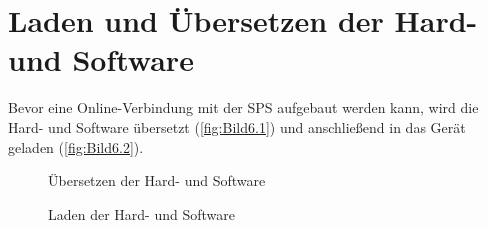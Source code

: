 \section{Laden und Übersetzen der Hard- und Software} \label{sec: laden_und_uebersetzen}

Bevor eine Online-Verbindung mit der SPS aufgebaut werden kann, wird die Hard- und Software übersetzt (\autoref{fig:Bild6.1}) und anschließend in das Gerät geladen (\autoref{fig:Bild6.2}).

\begin{figure}[H]
   \centering
   \caption[Übersetzen der Hard- und Software]{Übersetzen der Hard- und Software}
   \label{fig:Bild6.1}
\end{figure}

\begin{figure}[H]
   \centering
   \caption[Laden der Hard- und Software]{Laden der Hard- und Software}
   \label{fig:Bild6.2}
\end{figure}